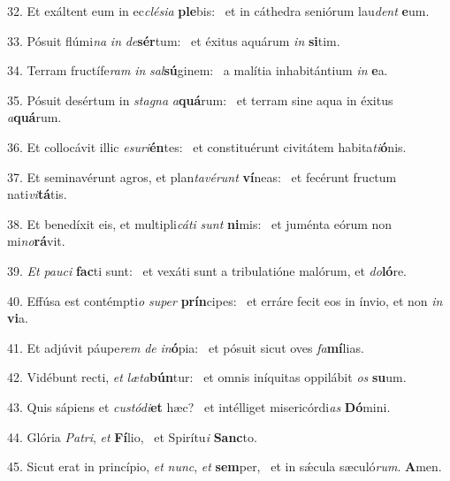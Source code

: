 32. Et exáltent eum in ec\textit{clé}\textit{si}\textit{a} \textbf{ple}bis: \ast\  et in cáthedra seniórum lau\textit{dent} \textbf{e}um.\

33. Pósuit flúmi\textit{na} \textit{in} \textit{de}\textbf{sér}tum: \ast\  et éxitus aquárum \textit{in} \textbf{si}tim.\

34. Terram fructífe\textit{ram} \textit{in} \textit{sal}\textbf{sú}ginem: \ast\  a malítia inhabitántium \textit{in} \textbf{e}a.\

35. Pósuit desértum in \textit{sta}\textit{gna} \textit{a}\textbf{quá}rum: \ast\  et terram sine aqua in éxitus \textit{a}\textbf{quá}rum.\

36. Et collocávit illic \textit{e}\textit{su}\textit{ri}\textbf{én}tes: \ast\  et constituérunt civitátem habita\textit{ti}\textbf{ó}nis.\

37. Et seminavérunt agros, et plan\textit{ta}\textit{vé}\textit{runt} \textbf{ví}neas: \ast\  et fecérunt fructum nati\textit{vi}\textbf{tá}tis.\

38. Et benedíxit eis, et multipli\textit{cá}\textit{ti} \textit{sunt} \textbf{ni}mis: \ast\  et juménta eórum non mi\textit{no}\textbf{rá}vit.\

39. \textit{Et} \textit{pau}\textit{ci} \textbf{fac}ti sunt: \ast\  et vexáti sunt a tribulatióne malórum, et \textit{do}\textbf{ló}re.\

40. Effúsa est contémpti\textit{o} \textit{su}\textit{per} \textbf{prín}cipes: \ast\  et erráre fecit eos in ínvio, et non \textit{in} \textbf{vi}a.\

41. Et adjúvit páupe\textit{rem} \textit{de} \textit{in}\textbf{ó}pia: \ast\  et pósuit sicut oves \textit{fa}\textbf{mí}lias.\

42. Vidébunt recti, \textit{et} \textit{læ}\textit{ta}\textbf{bún}tur: \ast\  et omnis iníquitas oppilábit \textit{os} \textbf{su}um.\

43. Quis sápiens et \textit{cus}\textit{tó}\textit{di}\textbf{et} hæc? \ast\  et intélliget misericórdi\textit{as} \textbf{Dó}mini.\

44. Glória \textit{Pa}\textit{tri}, \textit{et} \textbf{Fí}lio, \ast\  et Spirítu\textit{i} \textbf{Sanc}to.\

45. Sicut erat in princípio, \textit{et} \textit{nunc}, \textit{et} \textbf{sem}per, \ast\  et in sǽcula sæculó\textit{rum}. \textbf{A}men.\

